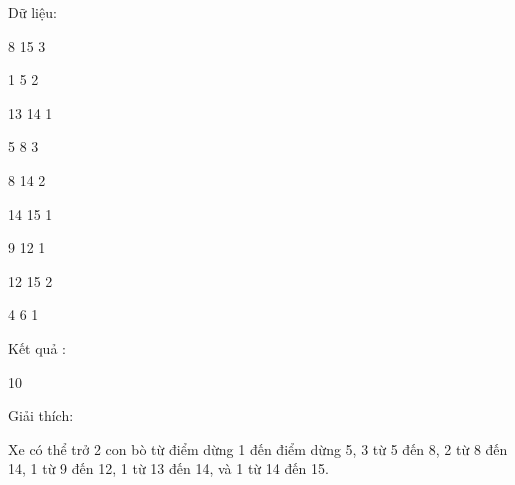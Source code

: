 Dữ liệu:  

   8 15 3   


   1 5 2   


   13 14 1   


   5 8 3   


   8 14 2   


   14 15 1   


   9 12 1   


   12 15 2   


   4 6 1  

   Kết quả :  

   10  

   Giải thích:  

   Xe có thể trở 2 con bò từ điểm dừng 1 đến điểm dừng 5, 3 từ 5 đến 8, 2 từ 8 đến 14, 1 từ 9 đến 12, 1 từ 13 đến 14, và 1 từ 14 đến 15.